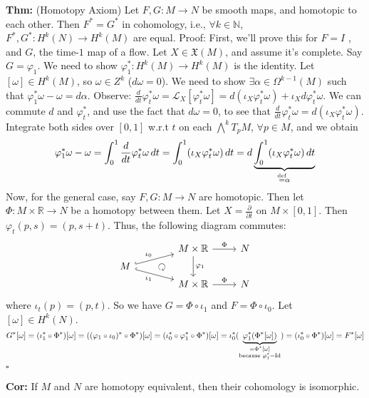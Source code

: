 \documentclass[10pt,letterpaper]{article}
\newcommand{\n}{\hfill\break}
\newcommand{\nn}{\vspace{0.5\baselineskip}\n}
\newcommand{\hangblock}[2]{\par\noindent\settowidth{\hangindent}{\textbf{#1: }}\textbf{#1: }\nolinebreak#2}
\newcommand{\thm}[1]{\hangblock{Thm}{#1}}
\newcommand{\cor}[1]{\hangblock{Cor}{#1}}
\newcommand{\proven}{\;$\square$\n}
\newcommand{\ptxt}[1]{\textrm{\textnormal{#1}}}
\newcommand{\naturals}{\mathbb{N}}
\newcommand{\N}{\naturals}
\newcommand{\reals}{\mathbb{R}}
\newcommand{\R}{\reals}
\newcommand{\of}{\circ}
\newcommand{\Id}{\textrm{\textnormal{Id}}}
\newcommand{\pd}[2]{\frac{\partial{}#1}{\partial{}#2}}
\newcommand{\labeledeq}[1]{\overset{\mathclap{\ptxt{#1}}}{=}}
\newcommand{\eqdef}{\labeledeq{def}}
\begin{document}
\thm{
	(Homotopy Axiom) Let $F,G:M\to{}N$ be smooth maps, and homotopic to each other. Then $F^{*}=G^{*}$ in cohomology, i.e., $\forall{}k\in\N$, $F^{*},G^{*}:H^{k}(N)\to{}H^{k}(M)$ are equal.\nn
	Proof: First, we'll prove this for $F=I$ , and $G$, the time-$1$ map of a flow. Let $X\in\mathfrak{X}(M)$, and assume it's complete. Say $G=\varphi_{1}$. We need to show $\varphi_{1}^{*}:H^{k}(M)\to{}H^{k}(M)$ is the identity.\nn
	Let $[\omega]\in{}H^{k}(M)$, so $\omega\in{}Z^{k}$ ($d\omega=0$). We need to show $\exists\alpha\in\Omega^{k-1}(M)$ such that $\varphi_{1}^{*}\omega-\omega=d\alpha$.\nn
	Observe: $\frac{d}{dt}\varphi_{t}^{*}\omega=\mathcal{L}_{X}[\varphi_{t}^{*}\omega]=d(\iota_{X}\varphi_{t}^{*}\omega)+\iota_{X}d\varphi_{t}^{*}\omega$. We can commute $d$ and $\varphi_{t}^{*}$, and use the fact that $d\omega=0$, to see that $\frac{d}{dt}\varphi_{t}^{*}\omega=d(\iota_{X}\varphi_{t}^{*}\omega)$. Integrate both sides over $[0,1]$ w.r.t $t$ on each $\bigwedge^{k}T_{p}M$, $\forall{}p\in{}M$, and we obtain
	\[
		\varphi_{1}^{*}\omega-\omega=\int_{0}^{1}\frac{d}{dt}\varphi_{t}^{*}\omega\,dt=\int_{0}^{1}(\iota_{X}\varphi_{t}^{*}\omega)\,dt=d\underbrace{\int_{0}^{1}(\iota_{X}\varphi_{t}^{*}\omega)\,dt}_{\eqdef\alpha}
	\]
	Now, for the general case, say $F,G:M\to{}N$ are homotopic. Then let $\Phi:M\times\R\to{}N$ be a homotopy between them. Let $X=\pd{}{t}$ on $M\times[0,1]$. Then $\varphi_{t}(p,s)=(p,s+t)$. Thus, the following diagram commutes:
	\[
		\begin{tikzcd}[ampersand replacement=\&]
			\&[-5pt] \&[-20pt] M\times\R \arrow[r,"\Phi"] \arrow[dd,"\varphi_{1}"] \& N\\[-15pt]
			M \arrow[urr,hookrightarrow,"\iota_{0}"] \arrow[drr,hookrightarrow,"\iota_{1}",swap] \& \rotatebox[origin=c]{180}{$\circlearrowright$} \\[-15pt]
			\& \& M\times\R \arrow[r,"\Phi"] \& N
		\end{tikzcd}
	\]
	where $\iota_{t}(p)=(p,t)$. So we have $G=\Phi\of\iota_{1}$ and $F=\Phi\of\iota_{0}$.\nn
	Let $[\omega]\in{}H^{k}(N)$.
	\[
		G^{*}[\omega]=(\iota_{1}^{*}\of\Phi^{*})[\omega]=((\varphi_{1}\of\iota_{0})^{*}\of\Phi^{*})[\omega]=(\iota_{0}^{*}\of\varphi_{1}^{*}\of\Phi^{*})[\omega]=\iota_{0}^{*}(\underbrace{\varphi_{1}^{*}(\Phi^{*}[\omega])}_{\substack{=\Phi^{*}[\omega]\\ \ptxt{because }\varphi_{1}^{*}=\Id}})=(\iota_{0}^{*}\of\Phi^{*})[\omega]=F^{*}[\omega]
	\]
	\proven
}

\cor{
	If $M$ and $N$ are homotopy equivalent, then their cohomology is isomorphic.\n
}
\end{document}
